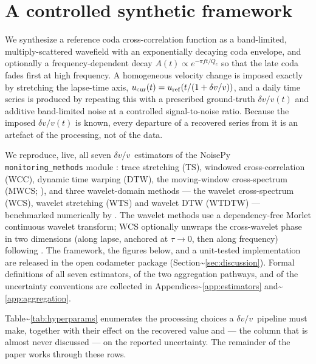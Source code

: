\documentclass[
  11pt,
  letterpaper,
]{article}
\providecommand{\dvv}{\ensuremath{\delta v/v}}
\begin{document}
\section{A controlled synthetic framework}\label{sec:methods}

We synthesize a reference coda cross-correlation function as a
band-limited, multiply-scattered wavefield with an exponentially
decaying coda envelope, and optionally a frequency-dependent decay
\(A(t)\propto e^{-\pi f t/Q_c}\) so that the late coda fades first at
high frequency. A homogeneous velocity change is imposed exactly by
stretching the lapse-time axis, \(u_{\rm cur}(t) = u_{\rm
ref}\!\left(t/(1+\dvv)\right)\), and a daily time series is produced by
repeating this with a prescribed ground-truth \(\dvv(t)\) and additive
band-limited noise at a controlled signal-to-noise ratio. Because the
imposed \(\dvv(t)\) is known, every departure of a recovered series from
it is an artefact of the processing, not of the data.

We reproduce, live, all seven \dvv~estimators of the NoisePy
\texttt{monitoring\_methods} module \citep{Jiang2020}: trace stretching
(TS), windowed cross-correlation (WCC), dynamic time warping (DTW), the
moving-window cross-spectrum (MWCS; \citet{Clarke2011}), and three
wavelet-domain methods --- the wavelet cross-spectrum (WCS), wavelet
stretching (WTS) and wavelet DTW (WTDTW) --- benchmarked numerically by
\citet{Yuan2021}. The wavelet methods use a dependency-free Morlet
continuous wavelet transform; WCS optionally unwraps the cross-wavelet
phase in two dimensions (along lapse, anchored at \(\tau\!\to\!0\), then
along frequency) following \citet{Mao2020}. The framework, the figures
below, and a unit-tested implementation are released in the open
codameter package (Section\textasciitilde{}\ref{sec:discussion}). Formal
definitions of all seven estimators, of the two aggregation pathways,
and of the uncertainty conventions are collected in
Appendices\textasciitilde{}\ref{app:estimators}
and\textasciitilde{}\ref{app:aggregation}.

Table\textasciitilde{}\ref{tab:hyperparams} enumerates the processing
choices a \dvv~pipeline must make, together with their effect on the
recovered value and --- the column that is almost never discussed --- on
the reported uncertainty. The remainder of the paper works through these
rows.
\end{document}
